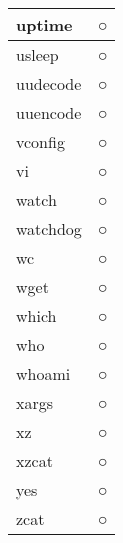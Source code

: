 \begin{longtable}{p{40mm}p{40mm}}
uptime &  ○ \\ \hline
usleep &  ○ \\ \hline
uudecode &  ○ \\ \hline
uuencode &  ○ \\ \hline
vconfig & ○ \\ \hline
vi &  ○ \\ \hline
watch & ○ \\ \hline
watchdog &  ○ \\ \hline
wc &  ○ \\ \hline
wget &  ○ \\ \hline
which & ○ \\ \hline
who & ○ \\ \hline
whoami &  ○ \\ \hline
xargs & ○ \\ \hline
xz &  ○ \\ \hline
xzcat & ○ \\ \hline
yes & ○ \\ \hline
zcat &  ○ \\ \hline
\end{longtable}















